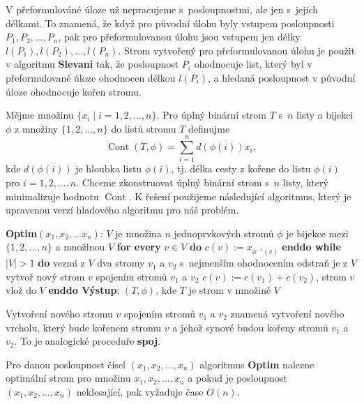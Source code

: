 \documentclass[a4paper,12pt]{article}
\DeclareMathOperator*{\Cont}{Cont}
\begin{document}
V přeformulováné úloze už nepracujeme s~posloupnostmi, ale jen s~jejich délkami. 
To znamená, že když pro původní úlohu 
byly vstupem posloupnosti $P_1,P_2,\dots,
P_n$, pak pro 
přeformulovanou úlohu jsou vstupem jen délky  
$l(P_1),l(P_2),\dots,l(P_n)$. Strom vytvořený pro 
přeformulovanou úlohu  
je použit v algoritmu {\bf Slevani}  
tak, že  posloupnost $P_i$ ohodnocuje list, který byl v 
přeformulované úloze ohodnocen délkou $l(P_i)$, a hledaná posloupnost 
v původní úloze ohodnocuje kořen stromu. 

Mějme množinu $\{x_i\mid i=1,2,\dots,n\}$.  Pro úplný binární 
strom $T$ s~$n$ listy a bijekci $\phi$ z množiny $\{1,2,\dots,
n\}$ do 
listů stromu $T$ definujme 
$$\Cont(T,\phi )=\sum_{i=1}^nd(\phi (i))x_i,$$
kde $d(\phi (i))$ je hloubka listu $\phi (i)$, tj.  délka cesty z 
kořene do listu $\phi (i)$  pro $i=1,2,\dots,n$.  
Chceme zkonstruovat úplný binární strom s~$n$ listy, 
který minimalizuje hodnotu $\Cont$. K řešení 
použijeme následující algoritmus, který je upravenou verzí 
hladového algoritmu pro náš problém.

{\bf Optim$(x_1,x_2,\dots x_n)$}:\newline 
$V$ je množina $n$ jednoprvkových stromů\newline 
$\phi$ je bijekce mezi $\{1,2,\dots,n\}$ a množinou $V$\newline 
{\bf for every} $v\in V$ {\bf do} $c(v):=x_{\phi^{-1}(v)}$ {\bf enddo\newline 
while} $|V|>1$ {\bf do\newline 
\phantom{{\rm---}}}vezmi z $V$ dva stromy $v_1$ a $v_2$ s~nejmenším ohodnocením\newline 
\phantom{---}odstraň je z $V$\newline 
\phantom{---}vytvoř nový strom $v$ spojením stromů $
v_1$ a $v_2$\newline 
\phantom{---}$c(v):=c(v_1)+c(v_2)$, strom $v$ vlož do $V$\newline 
{\bf enddo\newline 
Výstup}: $(T,\phi )$, kde $T$ je strom v množině $V$

Vytvoření nového stromu $v$ spojením stromů 
$v_1$ a $v_2$ znamená vytvoření nového vrcholu, který bude 
kořenem stromu $v$ a jehož synové budou kořeny stromů 
$v_1$ a $v_2$. To je analogické proceduře {\bf spoj}.

\begin{veta}Pro danou posloupnost čísel 
$(x_1,x_2,\dots,x_n)$ algoritmus {\bf Optim} nalezne optimální strom 
pro množinu $x_1,x_2,\dots,x_n$ a pokud je posloupnost 
$(x_1,x_2,\dots,x_n)$ neklesající, pak vyža\-du\-je čase 
$O(n)$.  
\end{veta}
\end{document}
